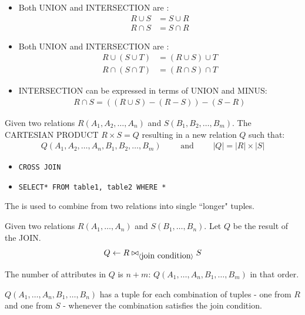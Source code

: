       \begin{itemize}
        \item Both UNION and INTERSECTION are :
          \begin{align*}
            R \cup S &= S \cup R \\
            R \cap S &= S \cap R
          \end{align*}
        \item Both UNION and INTERSECTION are :
          \begin{align*}
            R \cup (S \cup T) &= (R \cup S) \cup T \\
            R \cap (S \cap T) &= (R \cap S) \cap T
          \end{align*}
        \item INTERSECTION can be expressed in terms of UNION and MINUS:
          \begin{align*}
            R \cap S = ((R \cup S) - (R - S)) - (S - R)
          \end{align*}
      \end{itemize}

      \par Given two relations $R(A_1, A_2, \ldots, A_n)$ and $S(B_1, B_2, \ldots, B_m)$. The CARTESIAN PRODUCT $R \times S = Q$ resulting in a new relation $Q$ such that:
      \begin{align*}
        Q(A_1, A_2, \ldots, A_n, B_1, B_2, \ldots, B_m) \qquad \mbox{ and }
        \qquad |Q| = |R| \times |S|
      \end{align*}

      \begin{itemize}
        \item \lstinline{CROSS JOIN}
        \item \lstinline{SELECT* FROM table1, table2 WHERE *}
      \end{itemize}

      \par The  is used to combine  from two relations into single ``longer" tuples.
      \par Given two relations $R(A_{1}, \ldots, A_{n})$ and $S(B_{1}, \ldots, B_{n})$. Let $Q$ be the result of the JOIN.
      \begin{align*}
        Q \leftarrow R \bowtie_{\langle \mbox{join condition} \rangle} S
      \end{align*}
      \par The number of attributes in $Q$ is $n + m$: $Q(A_1, \ldots, A_n, B_1, \ldots, B_m)$ in that order.
      \par $Q(A_1, \ldots, A_n, B_1, \ldots, B_n)$ has a tuple for each combination of tuples - one from $R$ and one from $S$ - whenever the combination satisfies the join condition.

